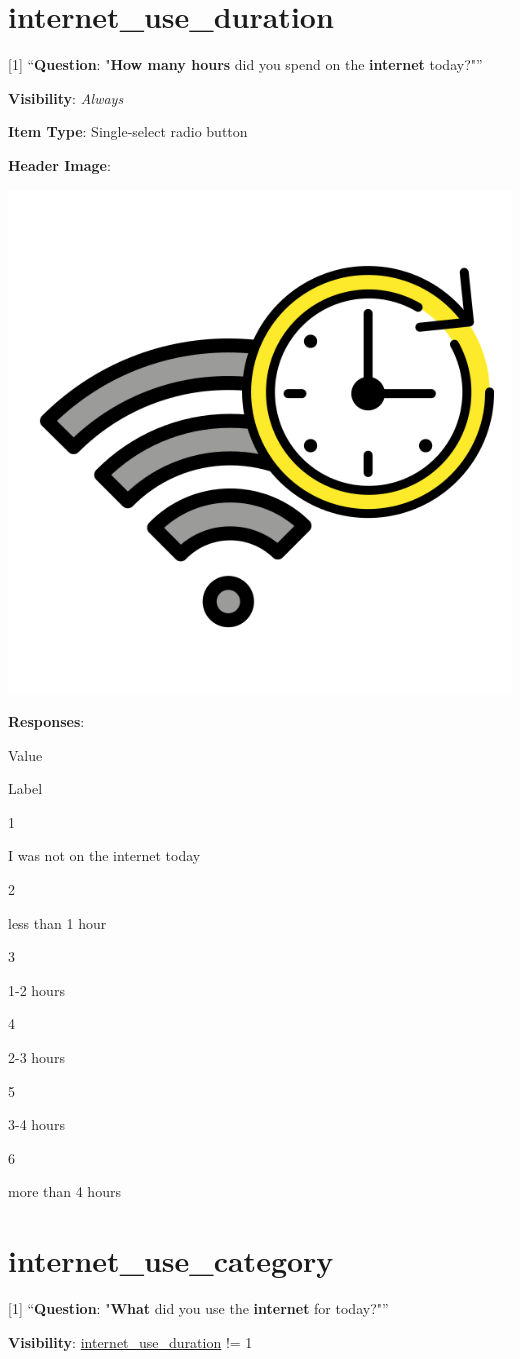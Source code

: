 \documentclass[]{book}
\begin{document}
\hypertarget{internet_use_duration}{%
\section{internet\_use\_duration}\label{internet_use_duration}}

{[}1{]} ``\textbf{Question}: "\textbf{How many hours} did you spend on the \textbf{internet} today?"''

\textbf{Visibility}: \emph{Always}

\textbf{Item Type}: Single-select radio button

\textbf{Header Image}:

\begin{flushleft}\includegraphics[width=0.33\linewidth]{downloadFigs4latex_NIMH_Applet_Codebook/internet_use_duration_headerImg} \end{flushleft}

\textbf{Responses}:

Value

Label

1

I was not on the internet today

2

less than 1 hour

3

1-2 hours

4

2-3 hours

5

3-4 hours

6

more than 4 hours

\hypertarget{internet_use_category}{%
\section{internet\_use\_category}\label{internet_use_category}}

{[}1{]} ``\textbf{Question}: "\textbf{What} did you use the \textbf{internet} for today?"''

\textbf{Visibility}: \protect\hyperlink{internet_use_duration}{internet\_use\_duration} != 1
\end{document}
